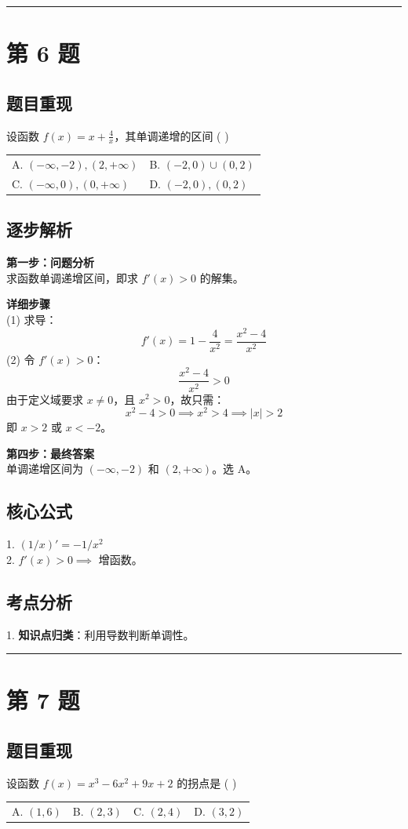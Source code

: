 \documentclass[10pt, a4paper]{ctexart}
\newcommand{\problemheader}{
    \vspace{0.5cm}
    \noindent\rule[0.5ex]{\linewidth}{2pt} %
}
\newcommand{\analysisheader}{
    \vspace{0.2cm}
    \noindent{\color{red}\rule[0.5ex]{\linewidth}{0.5pt}} %
    \vspace{0.1cm}
}
\begin{document}
\problemheader
\section*{第 6 题}
\subsection*{题目重现}
设函数 $f(x) = x + \frac{4}{x}$，其单调递增的区间 ( \quad ) \\
\begin{tabularx}{\linewidth}{@{} *{2}{X} @{}}
    A. $(-\infty,-2),(2,+\infty)$ & B. $(-2,0) \cup (0,2)$ \\
    C. $(-\infty,0),(0,+\infty)$  & D. $(-2,0),(0,2)$
\end{tabularx}

\analysisheader
{\color{red}
\subsection*{逐步解析}
\textbf{第一步：问题分析} \\
求函数单调递增区间，即求 $f'(x) > 0$ 的解集。

\textbf{详细步骤} \\
(1) 求导：
\[ f'(x) = 1 - \frac{4}{x^2} = \frac{x^2 - 4}{x^2} \]
(2) 令 $f'(x) > 0$：
\[ \frac{x^2 - 4}{x^2} > 0 \]
由于定义域要求 $x \ne 0$，且 $x^2 > 0$，故只需：
\[ x^2 - 4 > 0 \implies x^2 > 4 \implies |x| > 2 \]
即 $x > 2$ 或 $x < -2$。

\textbf{第四步：最终答案} \\
单调递增区间为 $(-\infty, -2)$ 和 $(2, +\infty)$。选 A。

\subsection*{核心公式}
1. $(1/x)' = -1/x^2$ \\
2. $f'(x) > 0 \implies$ 增函数。

\subsection*{考点分析}
1. \textbf{知识点归类}：利用导数判断单调性。
}

\problemheader
\section*{第 7 题}
\subsection*{题目重现}
设函数 $f(x) = x^3 - 6x^2 + 9x + 2$ 的拐点是 ( \quad ) \\
\begin{tabularx}{\linewidth}{@{} *{4}{X} @{}}
    A. $(1,6)$ & B. $(2,3)$ & C. $(2,4)$ & D. $(3,2)$
\end{tabularx}
\end{document}
